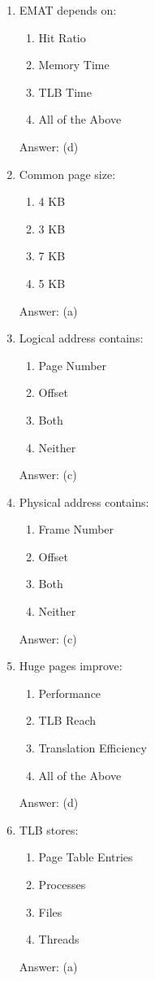 \begin{enumerate}
\item EMAT depends on:
\begin{enumerate}[label=(\alph*)]
\item Hit Ratio
\item Memory Time
\item TLB Time
\item All of the Above
\end{enumerate}
Answer: (d)

\item Common page size:
\begin{enumerate}[label=(\alph*)]
\item 4 KB
\item 3 KB
\item 7 KB
\item 5 KB
\end{enumerate}
Answer: (a)

\item Logical address contains:
\begin{enumerate}[label=(\alph*)]
\item Page Number
\item Offset
\item Both
\item Neither
\end{enumerate}
Answer: (c)

\item Physical address contains:
\begin{enumerate}[label=(\alph*)]
\item Frame Number
\item Offset
\item Both
\item Neither
\end{enumerate}
Answer: (c)

\item Huge pages improve:
\begin{enumerate}[label=(\alph*)]
\item Performance
\item TLB Reach
\item Translation Efficiency
\item All of the Above
\end{enumerate}
Answer: (d)

\item TLB stores:
\begin{enumerate}[label=(\alph*)]
\item Page Table Entries
\item Processes
\item Files
\item Threads
\end{enumerate}
Answer: (a)


\end{enumerate}
